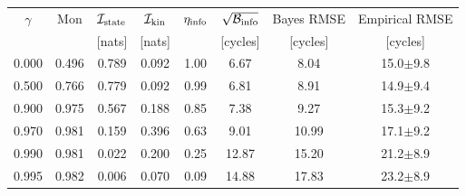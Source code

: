 \begin{tabular}{c c c c c c c c}
\hline
$\gamma$ & $\mathrm{Mon}$ & $\mathcal{I}_{\rm state}$ & $\mathcal{I}_{\rm kin}$ & $\eta_{\rm info}$ & $\sqrt{\mathcal{B}_{\rm info}}$ & Bayes RMSE & Empirical RMSE \\
 & & [nats] & [nats] & & [cycles] & [cycles] & [cycles] \\
\hline
0.000 & 0.496 & 0.789 & 0.092 & 1.00 & 6.67 & 8.04 & 15.0$\pm$9.8 \\
0.500 & 0.766 & 0.779 & 0.092 & 0.99 & 6.81 & 8.91 & 14.9$\pm$9.4 \\
0.900 & 0.975 & 0.567 & 0.188 & 0.85 & 7.38 & 9.27 & 15.3$\pm$9.2 \\
0.970 & 0.981 & 0.159 & 0.396 & 0.63 & 9.01 & 10.99 & 17.1$\pm$9.2 \\
0.990 & 0.981 & 0.022 & 0.200 & 0.25 & 12.87 & 15.20 & 21.2$\pm$8.9 \\
0.995 & 0.982 & 0.006 & 0.070 & 0.09 & 14.88 & 17.83 & 23.2$\pm$8.9 \\
\hline
\end{tabular}
